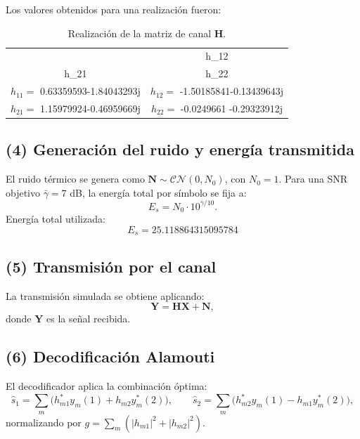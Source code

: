 \documentclass[11pt]{article}
\begin{document}
\noindent Los valores obtenidos para una realización fueron:

\begin{table}[H]
\centering
\begin{tabular}{cc}
\hline
\(\mathbf{H} = 
\begin{bmatrix}
h_{11} & h_{12}\\
h_{21} & h_{22}
\end{bmatrix}\)
& \\[4pt]
\hline
$h_{11} =$ 0.63359593-1.84043293j &
$h_{12} =$ -1.50185841-0.13439643j \\
$h_{21} =$ 1.15979924-0.46959669j &
$h_{22} =$ -0.0249661 -0.29323912j \\
\hline
\end{tabular}
\caption{Realización de la matriz de canal $\mathbf{H}$.}
\end{table}

\subsection*{(4) Generación del ruido y energía transmitida}

El ruido térmico se genera como $\mathbf{N} \sim \mathcal{CN}(0, N_0)$, con $N_0 = 1$.  
Para una SNR objetivo $\bar{\gamma}=7$ dB, la energía total por símbolo se fija a:
\[
E_s = N_0 \cdot 10^{\bar{\gamma}/10}.
\]
\noindent Energía total utilizada:
\[
E_s = 25.118864315095784
\]

\subsection*{(5) Transmisión por el canal}

La transmisión simulada se obtiene aplicando:
\[
\mathbf{Y} = \mathbf{H}\mathbf{X} + \mathbf{N},
\]
donde $\mathbf{Y}$ es la señal recibida.

\subsection*{(6) Decodificación Alamouti}

El decodificador aplica la combinación óptima:
\[
\hat{s}_1 = \sum_m \big(h_{m1}^* y_m(1) + h_{m2} y_m^*(2)\big),
\qquad
\hat{s}_2 = \sum_m \big(h_{m2}^* y_m(1) - h_{m1} y_m^*(2)\big),
\]
normalizando por $g = \sum_m(|h_{m1}|^2+|h_{m2}|^2)$.
\end{document}
